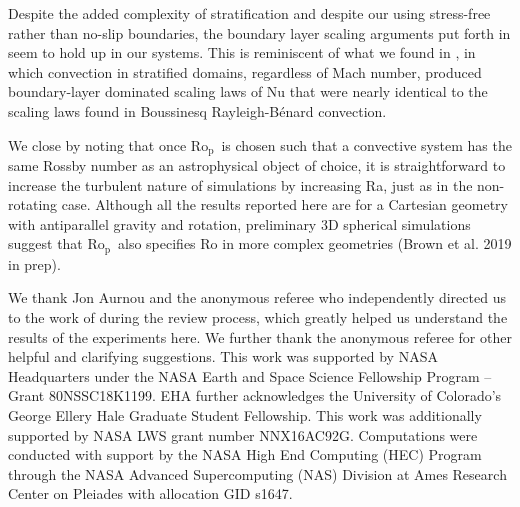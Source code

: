 \documentclass[twocolumn, amsmath, amsfonts, amssymb, trackchanges]{aastex62}
\newcommand{\RB}{Rayleigh-B\'{e}nard }
\newcommand{\pro}{\ensuremath{\text{Ro}_{\text{p}}}}
\begin{document}
Despite the added complexity of stratification and despite our using stress-free rather than
no-slip boundaries, the boundary layer scaling arguments put forth in \cite{king&all2012} seem
to hold up in our systems. This is reminiscent of what we found in \AB, in which
convection in stratified domains, regardless of Mach number, produced boundary-layer
dominated scaling laws of Nu that were nearly identical to the scaling laws found in
Boussinesq \RB convection.

We close by noting that once \pro$\,$ is chosen such that a convective system has the same
Rossby number as an astrophysical object of choice, it is straightforward to increase the 
turbulent nature of 
simulations by increasing Ra, just as in the non-rotating case.
Although all the results reported here are for a Cartesian geometry with 
antiparallel gravity and rotation, preliminary 3D spherical simulations suggest that 
\pro$\,$ also specifies Ro in more complex geometries (Brown et al. 2019 in prep).


\begin{acknowledgements}
We thank Jon Aurnou and the anonymous referee who independently directed
us to the work of \citet{king&all2012} during the review process, which greatly
helped us understand the results of the experiments here. We further thank
the anonymous referee for other helpful and clarifying suggestions.
This work was supported by NASA Headquarters under the NASA Earth and Space
Science Fellowship Program -- Grant 80NSSC18K1199.
EHA further acknowledges the University of Colorado's George 
Ellery Hale Graduate Student Fellowship.
This work was additionally supported by  NASA LWS grant number NNX16AC92G.  
Computations were conducted 
with support by the NASA High End Computing (HEC) Program through the NASA 
Advanced Supercomputing (NAS) Division at Ames Research Center on Pleiades
with allocation GID s1647.
\end{acknowledgements}
\end{document}
